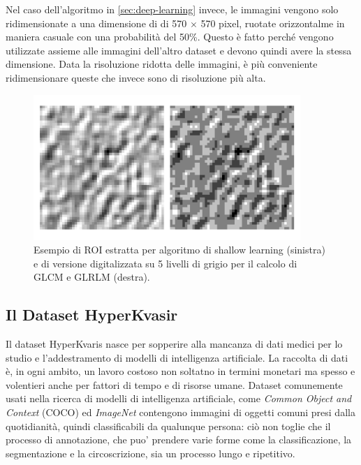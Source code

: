 Nel caso dell'algoritmo in \ref{sec:deep-learning} invece, le immagini
vengono solo ridimensionate a una dimensione di di 570 $\times$ 570 pixel,
ruotate orizzontalme in maniera casuale con una probabilità del 50\%.
Questo è fatto perché vengono utilizzate assieme alle immagini
dell'altro dataset e devono quindi avere la stessa dimensione.
Data la risoluzione ridotta delle immagini, è più conveniente
ridimensionare queste che invece sono di risoluzione più alta.

\begin{figure}
    \center
    \includegraphics[width=0.9\textwidth]{./assets/roi-shallow.png}
    \caption{\label{fig:roi-shallow} Esempio di ROI estratta per algoritmo di shallow learning (sinistra) e
    di versione digitalizzata su 5 livelli di grigio per il calcolo di GLCM e GLRLM (destra).}
\end{figure}

\subsection{Il Dataset HyperKvasir}

Il dataset HyperKvaris\cite{HyperKvasirDataset} nasce per sopperire
alla mancanza di dati medici per lo studio e l'addestramento
di modelli di intelligenza artificiale.
La raccolta di dati è, in ogni ambito, un lavoro costoso non 
soltatno in termini monetari ma spesso e volentieri anche
per fattori di tempo e di risorse umane.
Dataset comunemente usati nella ricerca di modelli di intelligenza
artificiale, come {\it Common Object and Context}\cite{cocodataset}
(COCO) ed {\it ImageNet} \cite{imagenet} contengono
immagini di oggetti comuni presi dalla quotidianità,
quindi classificabili da qualunque persona: ciò non toglie
che il processo di annotazione, che puo' prendere
varie forme come la classificazione, la segmentazione e la
circoscrizione, sia un processo lungo e ripetitivo.

